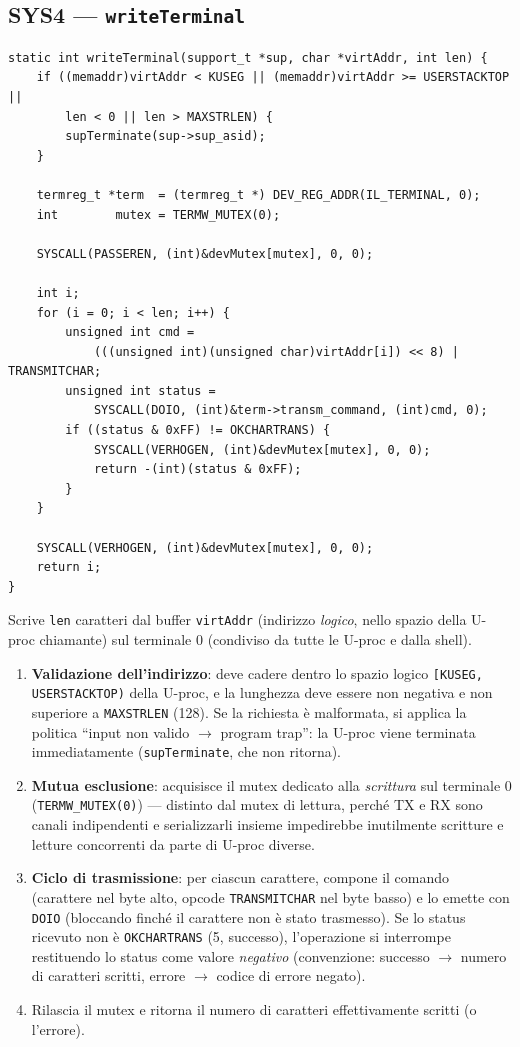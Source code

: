 \documentclass[11pt,a4paper]{article}
\newcommand{\code}[1]{\texttt{#1}}
\newcommand{\func}[1]{\textbf{\texttt{#1}}}
\begin{document}
\subsection{SYS4 --- \func{writeTerminal}}
\begin{lstlisting}
static int writeTerminal(support_t *sup, char *virtAddr, int len) {
    if ((memaddr)virtAddr < KUSEG || (memaddr)virtAddr >= USERSTACKTOP ||
        len < 0 || len > MAXSTRLEN) {
        supTerminate(sup->sup_asid);
    }

    termreg_t *term  = (termreg_t *) DEV_REG_ADDR(IL_TERMINAL, 0);
    int        mutex = TERMW_MUTEX(0);

    SYSCALL(PASSEREN, (int)&devMutex[mutex], 0, 0);

    int i;
    for (i = 0; i < len; i++) {
        unsigned int cmd =
            (((unsigned int)(unsigned char)virtAddr[i]) << 8) | TRANSMITCHAR;
        unsigned int status =
            SYSCALL(DOIO, (int)&term->transm_command, (int)cmd, 0);
        if ((status & 0xFF) != OKCHARTRANS) {
            SYSCALL(VERHOGEN, (int)&devMutex[mutex], 0, 0);
            return -(int)(status & 0xFF);
        }
    }

    SYSCALL(VERHOGEN, (int)&devMutex[mutex], 0, 0);
    return i;
}
\end{lstlisting}
Scrive \code{len} caratteri dal buffer \code{virtAddr} (indirizzo
\emph{logico}, nello spazio della U-proc chiamante) sul terminale 0
(condiviso da tutte le U-proc e dalla shell).
\begin{enumerate}
\item \textbf{Validazione dell'indirizzo}: deve cadere dentro lo spazio
  logico \code{[KUSEG, USERSTACKTOP)} della U-proc, e la lunghezza deve
  essere non negativa e non superiore a \code{MAXSTRLEN} (128). Se la
  richiesta è malformata, si applica la politica ``input non valido $\to$
  program trap'': la U-proc viene terminata immediatamente
  (\code{supTerminate}, che non ritorna).
\item \textbf{Mutua esclusione}: acquisisce il mutex dedicato alla
  \emph{scrittura} sul terminale 0 (\code{TERMW\_MUTEX(0)}) --- distinto dal
  mutex di lettura, perché TX e RX sono canali indipendenti e serializzarli
  insieme impedirebbe inutilmente scritture e letture concorrenti da parte
  di U-proc diverse.
\item \textbf{Ciclo di trasmissione}: per ciascun carattere, compone il
  comando (carattere nel byte alto, opcode \code{TRANSMITCHAR} nel byte
  basso) e lo emette con \code{DOIO} (bloccando finché il carattere non è
  stato trasmesso). Se lo status ricevuto non è \code{OKCHARTRANS} (5,
  successo), l'operazione si interrompe restituendo lo status come valore
  \emph{negativo} (convenzione: successo $\to$ numero di caratteri scritti,
  errore $\to$ codice di errore negato).
\item Rilascia il mutex e ritorna il numero di caratteri effettivamente
  scritti (o l'errore).
\end{enumerate}
\end{document}
